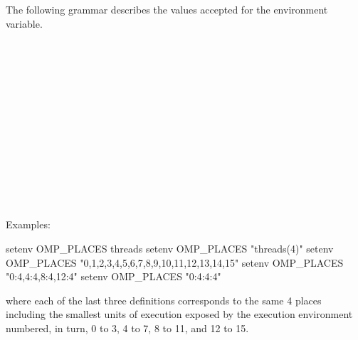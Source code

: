The following grammar describes the values accepted for the  
environment variable.

\begin{bnf*}
    \\
    \\
    \\
    \\
    \\
    \\
    \\
    \\
    \\
    \\
    \\
    \\
\end{bnf*}

\begin{samepage}
Examples:
\begin{ompEnv}
setenv OMP_PLACES threads
setenv OMP_PLACES "threads(4)"
setenv OMP_PLACES "{0,1,2,3},{4,5,6,7},{8,9,10,11},{12,13,14,15}"
setenv OMP_PLACES "{0:4},{4:4},{8:4},{12:4}"
setenv OMP_PLACES "{0:4}:4:4"
\end{ompEnv}
\end{samepage}

where each of the last three definitions corresponds to the same 4 places 
including the smallest units of execution exposed by the execution environment 
numbered, in turn, 0 to 3, 4 to 7, 8 to 11, and 12 to 15.

